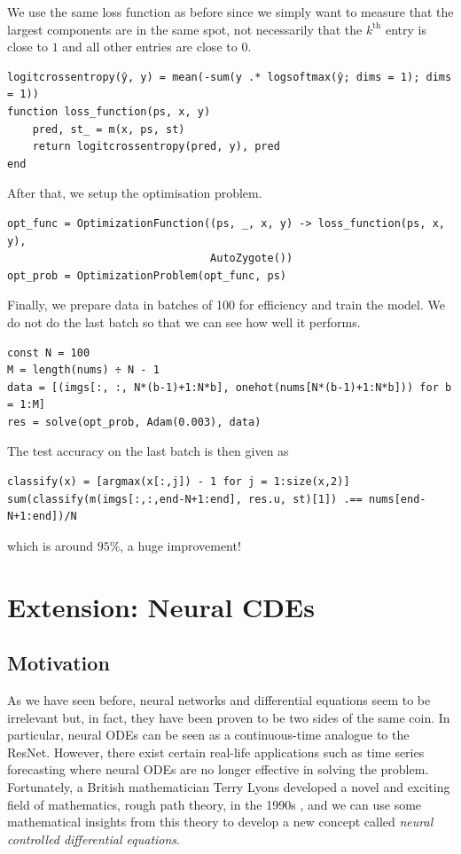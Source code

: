 \documentclass[a4paper,11pt,titlepage]{article}
\theoremstyle{definition}
\theoremstyle{plain}
\theoremstyle{remark}
\begin{document}
We use the same loss function as before since we simply want to measure that the largest components are in the same spot, not necessarily that the $k^{\mathrm{th}}$ entry is close to $1$ and all other entries are close to $0$.

\begin{verbatim}
logitcrossentropy(ŷ, y) = mean(-sum(y .* logsoftmax(ŷ; dims = 1); dims = 1))
function loss_function(ps, x, y)
    pred, st_ = m(x, ps, st)
    return logitcrossentropy(pred, y), pred
end
\end{verbatim}

After that, we setup the optimisation problem.

\begin{verbatim}
opt_func = OptimizationFunction((ps, _, x, y) -> loss_function(ps, x, y),
                                AutoZygote())
opt_prob = OptimizationProblem(opt_func, ps)
\end{verbatim}

Finally, we prepare data in batches of 100 for efficiency and train the model. We do not do the last batch so that we can see how well it performs.

\begin{verbatim}
const N = 100
M = length(nums) ÷ N - 1
data = [(imgs[:, :, N*(b-1)+1:N*b], onehot(nums[N*(b-1)+1:N*b])) for b = 1:M]
res = solve(opt_prob, Adam(0.003), data)
\end{verbatim}

The test accuracy on the last batch is then given as

\begin{verbatim}
classify(x) = [argmax(x[:,j]) - 1 for j = 1:size(x,2)]
sum(classify(m(imgs[:,:,end-N+1:end], res.u, st)[1]) .== nums[end-N+1:end])/N
\end{verbatim}

which is around $95\%$, a huge improvement!

\pagebreak
\section{Extension: Neural CDEs}

\subsection{Motivation}

As we have seen before, neural networks and differential equations seem to be irrelevant but, in fact, they have been proven to be two sides of the same coin. In particular, neural ODEs can be seen as a continuous-time analogue to the ResNet. However, there exist certain real-life applications such as time series forecasting where neural ODEs are no longer effective in solving the problem. Fortunately, a British mathematician Terry Lyons developed a novel and exciting field of mathematics, rough path theory, in the 1990s \cite{kidger2022neural}, and we can use some mathematical insights from this theory to develop a new concept called \textit{neural controlled differential equations}.
\end{document}
